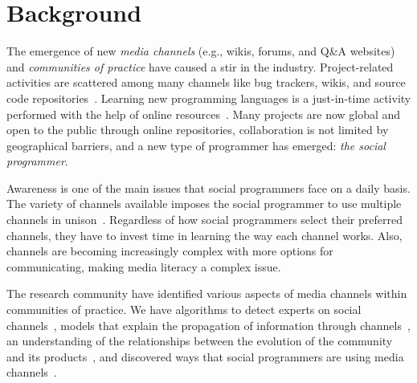 \section{Background}
\label{cha:background}

    The emergence of new \textit{media channels} (e.g., wikis, forums, and Q\&A websites) and \textit{communities of practice} have caused a stir in the industry.
    Project-related activities are scattered among many channels like bug trackers, wikis, and source code repositories~\cite{Guzzi2013}.
    Learning new programming languages is a just-in-time activity performed with the help of online resources~\cite{Sim2013,Storey2010,Hartmann2008}.
    Many projects are now global and open to the public through online repositories, collaboration is not limited by geographical barriers, and a new type of programmer has emerged: \textit{the social programmer}.

    Awareness is one of the main issues that social programmers face on a daily basis.
    The variety of channels available imposes the social programmer to use multiple channels in unison~\cite{Storey2010, Storey2014}.
    Regardless of how social programmers select their preferred channels, they have to invest time in learning the way each channel works.
    Also, channels are becoming increasingly complex with more options for communicating, making media literacy a complex issue.

    The research community have identified various aspects of media channels within communities of practice.
    We have algorithms to detect experts on social channels~\cite{Pal2011a,Pal2012a}, models that explain the propagation of information through channels~\cite{Jin2013, Jiang2013}, an understanding of the relationships between the evolution of the community and its products~\cite{German2013}, and discovered ways that social programmers are using media channels~\cite{Sowe2008a, Singh2009, Parnin2013}.

